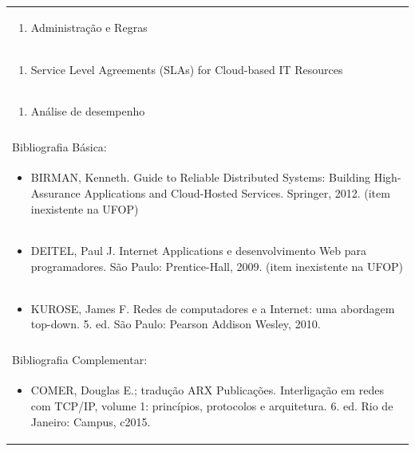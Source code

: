 \documentclass[11pt]{article}
\begin{document}
\begin{center}
\begin{longtable}{|p{4cm}|p{4cm}|p{4cm}|p{4cm}|}
\multicolumn{4}{|p{\dimexpr 16cm + 6\tabcolsep\relax}|}{\begin{enumerate}[start=7]\item Administração e Regras\end{enumerate}}\\
\multicolumn{4}{|p{\dimexpr 16cm + 6\tabcolsep\relax}|}{\begin{enumerate}[start=8]\item Service Level Agreements (SLAs) for Cloud-based IT Resources\end{enumerate}}\\
\multicolumn{4}{|p{\dimexpr 16cm + 6\tabcolsep\relax}|}{\begin{enumerate}[start=9]\item Análise de desempenho\end{enumerate}}\\
\multicolumn{4}{|p{\dimexpr 16cm + 6\tabcolsep\relax}|}{}\\
\hline
\multicolumn{4}{|p{16cm}|}{Bibliografia Básica:}\\*
\multicolumn{4}{|p{\dimexpr 16cm + 6\tabcolsep\relax}|}{\begin{itemize}\item BIRMAN, Kenneth. Guide to Reliable Distributed Systems: Building High-Assurance Applications and Cloud-Hosted Services. Springer, 2012. (item inexistente na UFOP)\end{itemize}}\\
\multicolumn{4}{|p{\dimexpr 16cm + 6\tabcolsep\relax}|}{\begin{itemize}\item DEITEL, Paul J. Internet Applications e desenvolvimento Web para programadores. São Paulo: Prentice-Hall, 2009. (item inexistente na UFOP)\end{itemize}}\\
\multicolumn{4}{|p{\dimexpr 16cm + 6\tabcolsep\relax}|}{\begin{itemize}\item KUROSE, James F. Redes de computadores e a Internet: uma abordagem top-down. 5. ed. São Paulo: Pearson Addison Wesley, 2010.\end{itemize}}\\
\multicolumn{4}{|p{16cm}|}{}\\
\hline
\multicolumn{4}{|p{16cm}|}{Bibliografia Complementar:}\\*
\multicolumn{4}{|p{\dimexpr 16cm + 6\tabcolsep\relax}|}{\begin{itemize}\item COMER, Douglas E.; tradução ARX Publicações. Interligação em redes com TCP/IP, volume 1: princípios, protocolos e arquitetura. 6. ed. Rio de Janeiro: Campus, c2015.\end{itemize}}\\

\end{longtable}
\end{center}
\end{document}
